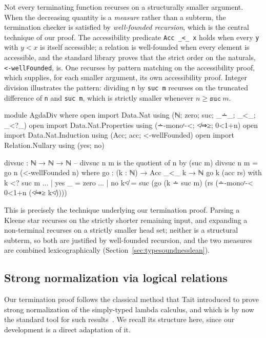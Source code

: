 \documentclass[preprint,12pt]{elsarticle}
\theoremstyle{definition}
\begin{document}
Not every terminating function recurses on a structurally smaller argument. When
the decreasing quantity is a \emph{measure} rather than a subterm, the termination
checker is satisfied by \emph{well-founded recursion}, which is the central
technique of our proof. The accessibility predicate \lstinline{Acc _<_ x} holds
when every \lstinline{y} with $y < x$ is itself accessible; a relation is
well-founded when every element is accessible, and the standard library proves
that the strict order on the naturals, \lstinline{<-wellFounded}, is. One recurses
by pattern matching on the accessibility proof, which supplies, for each smaller
argument, its own accessibility proof. Integer division illustrates the pattern:
dividing \lstinline{n} by \lstinline{suc m} recurses on the truncated difference
of \lstinline{n} and \lstinline{suc m}, which is strictly smaller whenever
$n \ge \mathtt{suc}\ m$.
\begin{code}[hide]
module AgdaDiv where
  open import Data.Nat using (ℕ; zero; suc; _∸_; _<_; _<?_)
  open import Data.Nat.Properties using (∸-monoʳ-<; ≮⇒≥; 0<1+n)
  open import Data.Nat.Induction using (Acc; acc; <-wellFounded)
  open import Relation.Nullary using (yes; no)
\end{code}
\clearpage
\begin{code}
  divsuc : ℕ → ℕ → ℕ           -- divsuc n m is the quotient of n by (suc m)
  divsuc n m = go n (<-wellFounded n)
    where
    go : (k : ℕ) → Acc _<_ k → ℕ
    go k (acc rs) with k <? suc m
    ... | yes _ = zero
    ... | no k≮ = suc (go (k ∸ suc m) (rs (∸-monoʳ-< 0<1+n (≮⇒≥ k≮))))
\end{code}
This is precisely the technique underlying our termination proof. Parsing a
Kleene star recurses on the strictly shorter remaining input, and expanding a
non-terminal recurses on a strictly smaller head set; neither is a structural
subterm, so both are justified by well-founded recursion, and the two measures are
combined lexicographically (Section~\ref{sec:typesoundnesslean}).

\subsection{Strong normalization via logical relations}
Our termination proof follows the classical method that Tait introduced to prove
strong normalization of the simply-typed lambda calculus, and which is by now the
standard tool for such results~\cite{plfa22.08}. We recall its structure here,
since our development is a direct adaptation of it.
\end{document}
